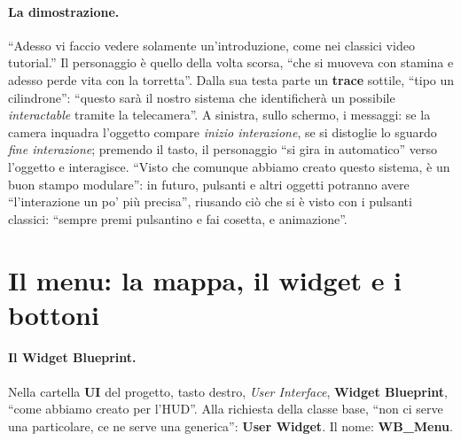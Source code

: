 \paragraph{La dimostrazione.} ``Adesso vi faccio vedere solamente un'introduzione, come
nei classici video tutorial.'' Il personaggio è quello della volta scorsa, ``che si muoveva
con stamina e adesso perde vita con la torretta''. Dalla sua testa parte un \textbf{trace}
sottile, ``tipo un cilindrone'': ``questo sarà il nostro sistema che identificherà un
possibile \emph{interactable} tramite la telecamera''. A sinistra, sullo schermo, i
messaggi: se la camera inquadra l'oggetto compare \emph{inizio interazione}, se si
distoglie lo sguardo \emph{fine interazione}; premendo il tasto, il personaggio ``si gira in
automatico'' verso l'oggetto e interagisce. ``Visto che comunque abbiamo creato questo
sistema, è un buon stampo modulare'': in futuro, pulsanti e altri oggetti potranno avere
``l'interazione un po' più precisa'', riusando ciò che si è visto con i pulsanti classici:
``sempre premi pulsantino e fai cosetta, e animazione''.

\section{Il menu: la mappa, il widget e i bottoni}
\label{ue12:sec:menu}

\paragraph{Il Widget Blueprint.} Nella cartella \textbf{UI} del progetto, tasto destro,
\emph{User Interface}, \textbf{Widget Blueprint}, ``come abbiamo creato per l'HUD''. Alla
richiesta della classe base, ``non ci serve una particolare, ce ne serve una generica'':
\textbf{User Widget}. Il nome: \textbf{WB\_Menu}.

